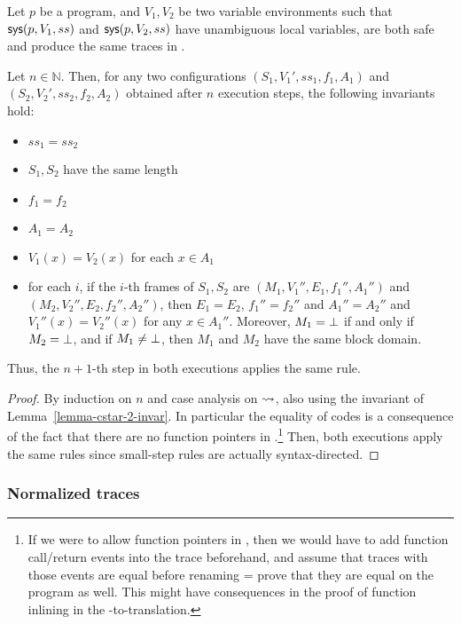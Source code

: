 \begin{lemma}
Let $p$ be a  program, and $V_1, V_2$ be two variable environments
such that $\text{\textsf{sys}}(p, V_1, ss)$ and $\text{\textsf{sys}}(p, V_2, ss)$ have unambiguous
local variables, are both safe and produce the same traces in .

Let $n \in \mathbb N$. Then, for any two  configurations $(S_1,
V_1', ss_1, f_1, A_1)$ and $(S_2, V_2', ss_2, f_2, A_2)$ obtained
after $n$  execution steps, the following invariants hold:
\begin{itemize}
\item $ss_1 = ss_2$
\item $S_1, S_2$ have the same length
\item $f_1 = f_2$
\item $A_1 = A_2$
\item $V_1(x) = V_2(x)$ for each $x \in A_1$
\item for each $i$, if the $i$-th frames of $S_1, S_2$ are $(M_1,
  V_1'', E_1, f_1'', A_1'')$ and $(M_2, V_2'', E_2, f_2'', A_2'')$,
  then $E_1 = E_2$, $f_1'' = f_2''$ and $A_1'' = A_2''$ and $V_1''(x)
  = V_2''(x)$ for any $x \in A_1''$. Moreover, $M_1 = \bot$ if and
  only if $M_2 = \bot$, and if $M_1 \not= \bot$, then $M_1$ and
  $M_2$ have the same block domain.
\end{itemize}
Thus, the $n+1$-th step in both executions applies the same  rule.
\end{lemma}
\begin{proof}
  By induction on $n$ and case analysis on $\leadsto$, also using the
  invariant of Lemma~\ref{lemma-cstar-2-invar}. In particular the
  equality of codes is a consequence of the fact that there are no
  function pointers in \cstar.\footnote{If we were to allow function
    pointers in \cstar, then we would have to add function call/return
    events into the \cstar trace beforehand, and assume that traces with
    those events are equal before renaming = prove that they are equal
    on the \lowstar program as well. This might have consequences in the
    proof of function inlining in the \fstar-to-\cstar translation.} Then,
  both executions apply the same  rules since  small-step rules
  are actually syntax-directed.
\end{proof}

\subsubsection{Normalized traces} \label{sec:norm-traces-detail}

